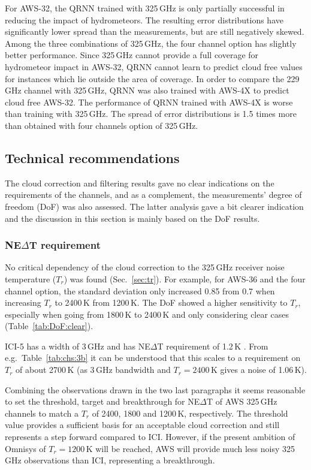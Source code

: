 \documentclass[12pt]{article}
\begin{document}
For AWS-32, the QRNN trained with 325\,GHz is only partially successful in
reducing the impact of hydrometeors. The resulting error distributions have
significantly lower spread than the measurements, but are still negatively
skewed. Among the three combinations of 325\,GHz, the four channel option has
slightly better performance. Since 325\,GHz cannot provide a full coverage for
hydrometeor impact in AWS-32, QRNN cannot learn to predict cloud free values
for instances which lie outside the area of coverage. In order to compare the
229\,GHz channel with 325\,GHz, QRNN was also trained with AWS-4X to predict
cloud free AWS-32. The performance of QRNN trained with AWS-4X is worse
than training with 325\,GHz. The spread of error distributions is 1.5 times
more than obtained with four channels option of 325\,GHz.



\subsection{Technical recommendations}
%
The cloud correction and filtering results gave no clear indications on the
requirements of the channels, and as a complement, the measurements' degree
of freedom (DoF) was also assessed. The latter analysis gave a bit clearer
indication and the discussion in this section is mainly based on the DoF results.


\subsubsection{NE$\Delta$T requirement}
%
No critical dependency of the cloud correction to the 325\,GHz receiver noise
temperature ($T_r$) was found (Sec.~\ref{sec:tr}). For example, for AWS-36 and
the four channel option, the standard deviation only increased 0.85 from 0.7
when increasing $T_r$ to 2400\,K from 1200\,K. The DoF showed a higher
sensitivity to $T_r$, especially when going from 1800\,K to 2400\,K and only
considering clear cases (Table~\ref{tab:DoF:clear}).

ICI-5 has a width of 3\,GHz and has NE$\Delta$T requirement of 1.2\,K
\citep{eriksson:towar:20}. From e.g.\ Table~\ref{tab:chs:3b} it can be
understood that this scales to a requirement on $T_r$ of about 2700\,K (as
3\,GHz bandwidth and $T_r=2400$\,K gives a noise of 1.06\,K).

Combining the observations drawn in the two last paragraphs it seems reasonable
to set the threshold, target and breakthrough for NE$\Delta$T of AWS 325\,GHz
channels to match a $T_r$ of 2400, 1800 and 1200\,K, respectively. The
threshold value provides a sufficient basis for an acceptable cloud correction
and still represents a step forward compared to ICI. However, if the present
ambition of Omnisys of $T_r=1200$\,K will be reached, AWS will provide much
less noisy 325\,GHz observations than ICI, representing a breakthrough.
\end{document}
